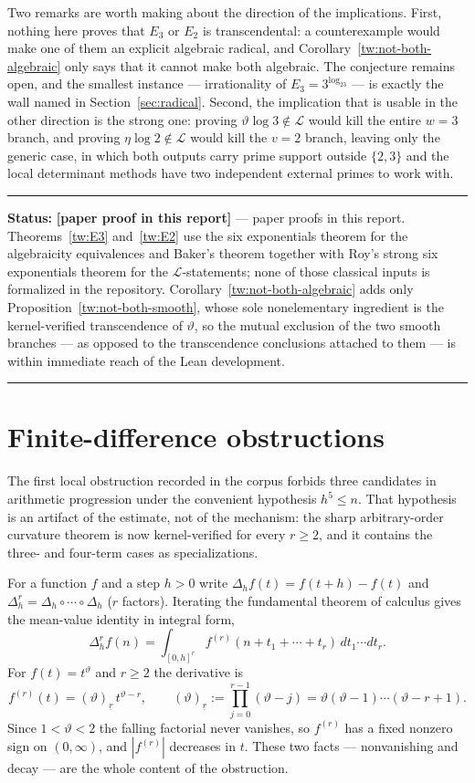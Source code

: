 \documentclass[11pt,oneside]{article}
\theoremstyle{definition}
\theoremstyle{remark}
\newcommand{\thetaq}{\vartheta}
\newcommand{\fall}[2]{\left(#1\right)_{\!\underline{#2}}}
\newcommand{\LL}{\mathcal L}
\newcommand{\statusnew}{\textcolor{newgreen}{\textbf{[paper proof in this report]}}}
\newenvironment{statusbox}[1]
{\begin{center}\begin{minipage}{0.94\textwidth}\raggedright\hbadness=10000\hrule
\vspace{0.45em}\textbf{Status:} #1\par\vspace{0.35em}}
{\vspace{0.35em}\hrule\end{minipage}\end{center}}
\begin{document}
Two remarks are worth making about the direction of the implications.  First, nothing here
proves that $E_3$ or $E_2$ is transcendental: a counterexample would make one of them an
explicit algebraic radical, and Corollary~\ref{tw:not-both-algebraic} only says that it cannot
make both algebraic.  The conjecture remains open, and the smallest instance --- irrationality
of $E_3=3^{\log_23}$ --- is exactly the wall named in Section~\ref{sec:radical}.  Second, the
implication that is usable in the other direction is the strong one: proving
$\thetaq\log3\notin\LL$ would kill the entire $w=3$ branch, and proving $\eta\log2\notin\LL$
would kill the $v=2$ branch, leaving only the generic case, in which both outputs carry prime
support outside $\{2,3\}$ and the local determinant methods have two independent external
primes to work with.

\begin{statusbox}{\statusnew{} --- paper proofs in this report.
Theorems~\ref{tw:E3} and~\ref{tw:E2} use the six exponentials theorem for the algebraicity
equivalences and Baker's theorem together with Roy's strong six exponentials theorem for the
$\LL$-statements; none of those classical inputs is formalized in the repository.
Corollary~\ref{tw:not-both-algebraic} adds only Proposition~\ref{tw:not-both-smooth}, whose
sole nonelementary ingredient is the kernel-verified transcendence of $\thetaq$, so the
mutual exclusion of the two smooth branches --- as opposed to the transcendence conclusions
attached to them --- is within immediate reach of the Lean development.}
\end{statusbox}

\section{Finite-difference obstructions}
\label{sec:differences}

The first local obstruction recorded in the corpus forbids three candidates in arithmetic
progression under the convenient hypothesis $h^{5}\le n$.  That hypothesis is an artifact of
the estimate, not of the mechanism: the sharp arbitrary-order curvature theorem is now
kernel-verified for every $r\ge2$, and it contains the three- and four-term cases as
specializations.

For a function $f$ and a step $h>0$ write $\Delta_hf(t)=f(t+h)-f(t)$ and
$\Delta_h^{r}=\Delta_h\circ\cdots\circ\Delta_h$ ($r$ factors).  Iterating the fundamental
theorem of calculus gives the mean-value identity in integral form,
\begin{equation}
\Delta_h^{r}f(n)=\int_{[0,h]^{r}}f^{(r)}(n+t_1+\cdots+t_r)\,dt_1\cdots dt_r .
\label{df:finite-diff-integral}
\end{equation}
For $f(t)=t^{\thetaq}$ and $r\ge2$ the derivative is
\[
 f^{(r)}(t)=\fall{\thetaq}{r}\,t^{\thetaq-r},
 \qquad
 \fall{\thetaq}{r}:=\prod_{j=0}^{r-1}(\thetaq-j)
 =\thetaq(\thetaq-1)\cdots(\thetaq-r+1).
\]
Since $1<\thetaq<2$ the falling factorial never vanishes, so $f^{(r)}$ has a fixed nonzero
sign on $(0,\infty)$, and $|f^{(r)}|$ decreases in $t$.  These two facts --- nonvanishing and
decay --- are the whole content of the obstruction.
\end{document}
